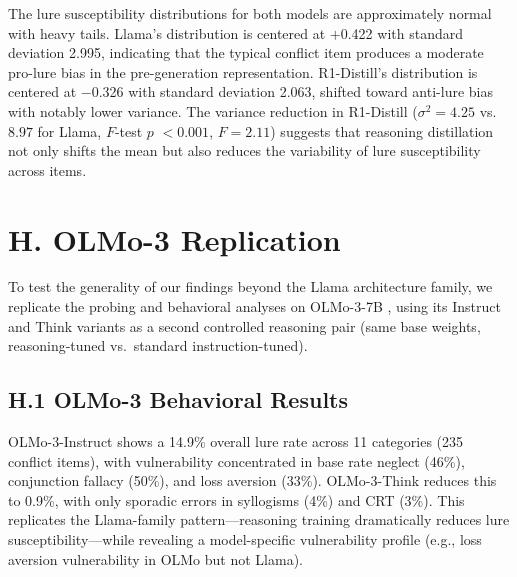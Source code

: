 \documentclass[accepted]{article}
\begin{document}
The lure susceptibility distributions for both models are approximately
normal with heavy tails.  Llama's distribution is centered at $+$0.422
with standard deviation 2.995, indicating that the typical conflict
item produces a moderate pro-lure bias in the pre-generation
representation.  R1-Distill's distribution is centered at $-$0.326
with standard deviation 2.063, shifted toward anti-lure bias with
notably lower variance.  The variance reduction in R1-Distill
($\sigma^2 = 4.25$ vs.\ $8.97$ for Llama, $F$-test $p$
$< 0.001$, $F = 2.11$) suggests that reasoning distillation not only shifts
the mean but also reduces the variability of lure susceptibility
across items.


\section*{H. OLMo-3 Replication}
\label{sec:appendix_olmo}

To test the generality of our findings beyond the Llama architecture
family, we replicate the probing and behavioral analyses on OLMo-3-7B
\citep{groeneveld2024olmo}, using its Instruct and Think variants as a
second controlled reasoning pair (same base weights, reasoning-tuned
vs.\ standard instruction-tuned).

\subsection*{H.1 OLMo-3 Behavioral Results}

OLMo-3-Instruct shows a 14.9\% overall lure rate across 11 categories
(235 conflict items), with vulnerability concentrated in base rate neglect
(46\%), conjunction fallacy (50\%), and loss aversion (33\%).
OLMo-3-Think reduces this to 0.9\%, with only sporadic errors in
syllogisms (4\%) and CRT (3\%).  This replicates the Llama-family
pattern---reasoning training dramatically reduces lure susceptibility---while
revealing a model-specific vulnerability profile (e.g., loss aversion
vulnerability in OLMo but not Llama).
\end{document}
